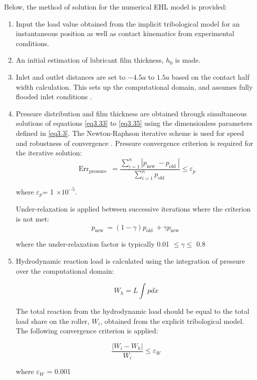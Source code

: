 Below, the method of solution for the numerical EHL model is provided:

\begin{enumerate} %
	\item Input the load value obtained from the implicit tribological model for an instantaneous position as well as contact kinematics from experimental conditions.
	\item An initial estimation of lubricant film thickness, $h_0$ is made.
	\item Inlet and outlet distances are set to $-4.5a$ to $1.5a$ based on the contact half width calculation. This sets up the computational domain, and assumes fully flooded inlet conditions \cite{Hamrock1976}. 
	\item Pressure distribution and film thickness are obtained through simultaneous solutions of equations \ref{eq3.33} to \ref{eq3.35} using the dimensionless parameters defined in \ref{eq3.3}. The Newton-Raphson iterative scheme is used for speed and robustness of convergence \cite{Okumara1982}. Pressure convergence criterion is required for the iterative solution:
	\begin{equation}\label{eq3.39}
		\operatorname{Err}_{\text {pressure }}=\frac{\sum_{i=1}^n\left|p_{\text {new }}-p_{\text {old }}\right|}{\sum_{i=1}^n p_{\text {old }}} \leq \varepsilon_p
	\end{equation}

	where $\varepsilon_p$= 1 $\times 10^{-5}$.
	
	Under-relaxation is applied between successive iterations where the criterion is not met:
	\begin{equation}\label{Under relaxation}
		p_{\text {new }}=(1-\gamma) p_{\text {old }}+\gamma p_{\text {new }}
	\end{equation}

	where the under-relaxation factor is typically 0.01 $\le\gamma\le$ 0.8
	
	\item Hydrodynamic reaction load is calculated using the integration of pressure over the computational domain:
	
	\begin{equation}\label{Reaction load integration EHL}
		W_h=L \int p d x
	\end{equation}

	The total reaction from the hydrodynamic load should be equal to the total load share on the roller, $W_i$, obtained from the explicit tribological model. The following convergence criterion is applied:
	
	\begin{equation}
		\frac{\left|W_i-W_h\right|}{W_i} \leq \varepsilon_W
	\end{equation}

	where $\varepsilon_W$ = 0.001 
\end{enumerate}

